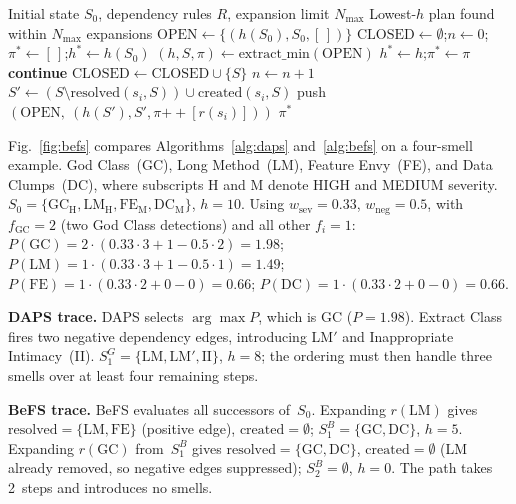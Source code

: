 \documentclass[conference]{IEEEtran}
\begin{document}
\begin{algorithm}[tb]
\caption{BeFS algorithm.}
\label{alg:befs}
\begin{algorithmic}[1]
\REQUIRE Initial state $S_0$, dependency rules $R$, expansion limit $N_{\max}$
\ENSURE Lowest-$h$ plan found within $N_{\max}$ expansions
\STATE $\text{OPEN} \leftarrow \{(h(S_0), S_0, [\,])\}$
\STATE $\text{CLOSED} \leftarrow \emptyset$;\quad $n \leftarrow 0$;\quad $\pi^* \leftarrow [\,]$;\quad $h^* \leftarrow h(S_0)$
  \STATE $(h, S, \pi) \leftarrow \text{extract\_min}(\text{OPEN})$
   \STATE $h^* \leftarrow h$;\quad $\pi^* \leftarrow \pi$ \ENDIF
   \STATE \textbf{continue} \ENDIF
  \STATE $\text{CLOSED} \leftarrow \text{CLOSED} \cup \{S\}$
  \STATE $n \leftarrow n+1$
    \STATE $S' \leftarrow (S \setminus \mathrm{resolved}(s_i,S))
                          \cup \mathrm{created}(s_i,S)$
      \STATE push$(\text{OPEN},\ (h(S'), S', \pi{+\!\!+}[r(s_i)]))$
    \ENDIF
  \ENDFOR
\ENDWHILE
\RETURN $\pi^*$
\end{algorithmic}
\end{algorithm}

Fig.~\ref{fig:befs} compares Algorithms~\ref{alg:daps} and~\ref{alg:befs} on a
four-smell example.
God Class~(GC), Long Method~(LM), Feature Envy~(FE), and Data Clumps~(DC),
where subscripts H and M denote HIGH and MEDIUM severity.
$S_0 = \{\mathrm{GC_H}, \mathrm{LM_H}, \mathrm{FE_M}, \mathrm{DC_M}\}$, $h{=}10$.
Using $w_{\mathrm{sev}}{=}0.33$, $w_{\mathrm{neg}}{=}0.5$,
with $f_{\mathrm{GC}}{=}2$ (two God Class detections) and all other
$f_i{=}1$:
$P(\mathrm{GC}){=}2{\cdot}(0.33{\cdot}3{+}1{-}0.5{\cdot}2){=}1.98$;
$P(\mathrm{LM}){=}1{\cdot}(0.33{\cdot}3{+}1{-}0.5{\cdot}1){=}1.49$;
$P(\mathrm{FE}){=}1{\cdot}(0.33{\cdot}2{+}0{-}0){=}0.66$;
$P(\mathrm{DC}){=}1{\cdot}(0.33{\cdot}2{+}0{-}0){=}0.66$.

\textbf{DAPS trace.}
DAPS selects $\arg\max P$, which is GC ($P{=}1.98$).
Extract Class fires two negative dependency edges, introducing LM$'$ and
Inappropriate Intimacy~(II).
$S_1^G = \{\mathrm{LM}, \mathrm{LM}', \mathrm{II}\}$, $h{=}8$;
the ordering must then handle three smells over at least four remaining steps.

\textbf{BeFS trace.}
BeFS evaluates all successors of~$S_0$.
Expanding $r(\mathrm{LM})$ gives
$\mathrm{resolved}{=}\{\mathrm{LM},\mathrm{FE}\}$
(positive edge), $\mathrm{created}{=}\emptyset$;
$S_1^B{=}\{\mathrm{GC},\mathrm{DC}\}$, $h{=}5$.
Expanding $r(\mathrm{GC})$ from~$S_1^B$ gives
$\mathrm{resolved}{=}\{\mathrm{GC},\mathrm{DC}\}$, $\mathrm{created}{=}\emptyset$
(LM already removed, so negative edges suppressed);
$S_2^B{=}\emptyset$, $h{=}0$.
The path takes 2~steps and introduces no smells.
\end{document}

